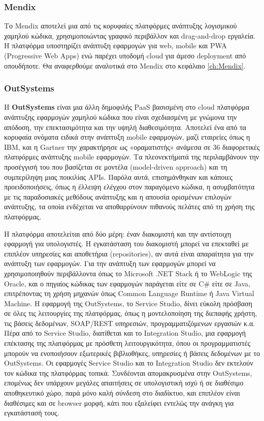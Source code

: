             \subsubsection{Mendix}
            Το Mendix αποτελεί μια από τις κορυφαίες πλατφόρμες ανάπτυξης λογισμικού χαμηλού κώδικα, χρησιμοποιώντας γραφικό περιβάλλον και drag-and-drop εργαλεία. Η πλατφόρμα υποστηρίζει ανάπτυξη εφαρμογών για web, mobile και PWA (Progressive Web Apps) ενώ παρέχει υποδομή cloud για άμεσο deployment από οπουδήποτε. Θα αναφερθούμε αναλυτικά στο Mendix στο κεφάλαιο \ref{ch:Mendix}.

            \subsubsection{OutSystems}
            Η \textbf{OutSystems} είναι μια άλλη δημοφιλής PaaS βασισμένη στο cloud πλατφόρμα ανάπτυξης εφαρμογών χαμηλού κώδικα που είναι σχεδιασμένη με γνώμονα την απόδοση, την επεκτασιμότητα και την υψηλή διαθεσιμότητα. Αποτελεί ένα από τα κορυφαία ονόματα ειδικά στην ανάπτυξη mobile εφαρμογών, μαζί εταιρείες όπως η IBM, και η Gartner την χαρακτήρησε ως «οραματιστής» ανάμεσα σε 36 διαφορετικές πλατφόρμες ανάπτυξης mobile εφαρμογών. Τα πλεονεκτήματά της περιλαμβάνουν την προσέγγισή του που βασίζεται σε μοντέλα (model-driven approach) και τη συμπερίληψη μιας ποικιλίας APIs. Παρόλα αυτά, επισημάνθηκαν και κάποιες προειδοποιήσεις, όπως η έλλειψη ελέγχου στον παραγόμενο κώδικα, η ασυμβατότητα με τις παραδοσιακές μεθόδους ανάπτυξης και η απουσία ορισμένων επιλογών ανάπτυξης, τα οποία ενδέχεται να αποθαρρύνουν πιθανούς πελάτες από τη χρήση της πλατφόρμας. \cite{QuadrantOutSystems}

            Η πλατφόρμα αποτελείται από δύο μέρη: έναν διακομιστή και την αντίστοιχη εφαρμογή για υπολογιστές. Η εγκατάσταση του διακομιστή μπορεί να επεκταθεί με επιπλέον υπηρεσίες και αποθετήρια (repositories), αν αυτά είναι απαραίτητα για την ανάπτυξη των εφαρμογών. Για την ανάπτυξη των εφαρμογών μπορεί να χρησιμοποιηθούν περιβάλλοντα όπως το Microsoft .NET Stack ή το WebLogic της Oracle, και ο πηγαίος κώδικας των εφαρμογών παράγεται είτε σε C\# είτε σε Java, επιτρέποντας τη χρήση μηχανών όπως Common Language Runtime ή Java Virtual Machine. Η εφαρμογή της OutSystems, το Service Studio, δίνει εύκολη πρόσβαση σε όλες τις λειτουργίες της πλατφόρμας, όπως η μοντελοποίηση της διεπαφής χρήστη, τις βάσεις δεδομένων, SOAP/REST υπηρεσιών, προγραμματιζόμενων εργασιών κ.α. Πέρα από το Service Studio, διατίθεται και το Integration Studio, μια εφαρμογή επέκτασης της πλατφόρμας με πρόσθετη λειτουργικότητα, όπου οι προγραμματιστές μπορούν να ενοποιήσουν εξωτερικές βιβλιοθήκες, υπηρεσίες ή βάσεις δεδομένων με το OutSystems. Οι εφαρμογές Service Studio και το Integration Studio δεν εκτελούν τον κώδικα της πλατφόρμας τοπικά. Συνδέονται απομακρυσμένα στην OutSystems, επομένως δεν υπάρχουν μεγάλες απαιτήσεις σε υπολογιστική ισχύ ή σε διαθέσιμο αποθηκευτικό χώρο, παρά μόνο καλή σύνδεση στο διαδίκτυο, και επιπλέον είναι διαθέσιμες και σε browser μορφή, κάτι που εξαλείφει εντελώς την ανάγκη για εγκατάστασή τους. \cite{OutSystemsGolovin} \cite{OutSystemsSite}

